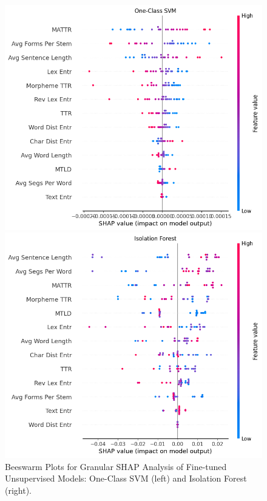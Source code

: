\documentclass[12pt,a4paper]{article}
\numberwithin{figure}{section}
\numberwithin{table}{section}
\numberwithin{definition}{section}
\begin{document}
\begin{figure}[!h]
  \centering
  \begin{minipage}{0.5\textwidth}
    \includegraphics[width=\textwidth]{OCSVM_SHAP_granular.png}
  \end{minipage}\hfill
  \begin{minipage}{0.5\textwidth}
    \includegraphics[width=\textwidth]{IF_SHAP_granular.png}
  \end{minipage}
    \caption{Beeswarm Plots for Granular SHAP Analysis of Fine-tuned Unsupervised Models: One-Class SVM (left) and Isolation Forest (right).}
    \label{fig:unsupervisedgranularshap}
\end{figure}
\end{document}
